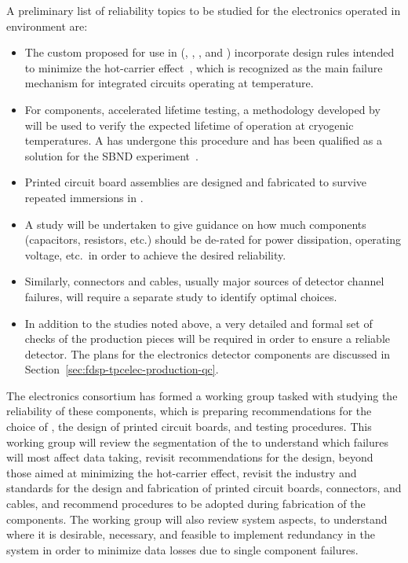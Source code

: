 A preliminary list of reliability topics to be studied for the  electronics operated 
in  environment are:
\begin{itemize}
\item The custom  proposed for use in  (, 
, , and ) incorporate design rules 
intended to minimize the hot-carrier effect~\cite{Li:CELAr,Hoff:2015hax}, 
which is recognized as the main failure mechanism for integrated circuits 
operating at  temperature.
\item For  components, accelerated lifetime testing, a methodology 
developed by ~\cite{nasa_nepp} will be used to verify the expected
lifetime of operation at cryogenic temperatures. A   has undergone
this procedure and has been qualified as a solution for the SBND experiment~\cite{Chen:2018zic}.
\item Printed circuit board assemblies are designed and fabricated to survive 
repeated immersions in \lntwo.
\item A study will be undertaken to give guidance on how much components (capacitors,
resistors, etc.) should be de-rated for power dissipation, operating voltage, etc.~in
order to achieve the desired reliability.
\item Similarly, connectors and cables, usually major sources of detector channel failures,
will require a separate study to identify optimal choices.
\item In addition to the  studies noted above, a very detailed
and formal set of  checks of the production pieces will be required in order to ensure
a reliable detector. The  plans for the  electronics
detector components are discussed in Section~\ref{sec:fdsp-tpcelec-production-qc}.
\end{itemize}
The  electronics consortium has formed a working group tasked with studying the reliability  
of these components, which is preparing recommendations for the choice of , 
the design of printed circuit boards, and testing procedures. This working group will review the 
segmentation of the  to understand which failures will most affect data taking, revisit recommendations for the  design, 
beyond those aimed at minimizing the hot-carrier effect, revisit the industry and 
 standards for the design and fabrication of printed circuit boards, connectors, 
and cables, and recommend  procedures to be adopted during 
fabrication of the  components. The working group will also review
system aspects, to understand where it is desirable, necessary, and feasible to implement 
redundancy in the system in order to minimize data losses due to single component failures. 
